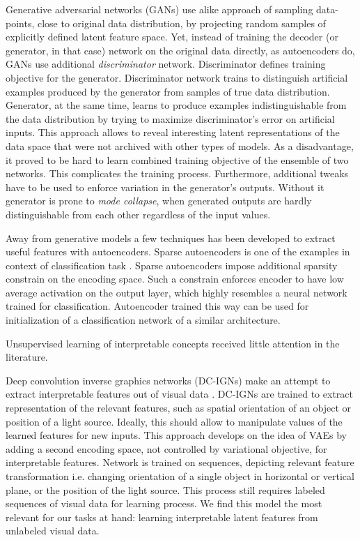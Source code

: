 Generative adversarial networks (GANs) \cite{Goodfellow2014} use alike approach of sampling data-points, close to original data distribution, by projecting random samples of explicitly defined latent feature space.
Yet, instead of training the decoder (or generator, in that case) network on the original data directly, as autoencoders do, GANs use additional \textit{discriminator} network.
Discriminator defines training objective for the generator.
Discriminator network trains to distinguish artificial examples produced by the generator from samples of true data distribution.
Generator, at the same time, learns to produce examples indistinguishable from the data distribution by trying to maximize discriminator's error on artificial inputs.
This approach allows to reveal interesting latent representations of the data space that were not archived with other types of models.
As a disadvantage, it proved to be hard to learn combined training objective of the ensemble of two networks.
This complicates the training process.
Furthermore, additional tweaks have to be used to enforce variation in the generator's outputs.
Without it generator is prone to \textit{mode collapse}, when generated outputs are hardly distinguishable from each other regardless of the input values.

Away from generative models a few techniques has been developed to extract useful features with autoencoders.
Sparse autoencoders is one of the examples in context of classification task \cite{Ng2011, Makhzani2013, Masci2011}.
Sparse autoencoders impose additional sparsity constrain on the encoding space.
Such a constrain enforces encoder to have low average activation on the output layer, which highly resembles a neural network trained for classification.
Autoencoder trained this way can be used for initialization of a classification network of a similar architecture.

Unsupervised learning of interpretable concepts received little attention in the literature.

Deep convolution inverse graphics networks (DC-IGNs) make an attempt to extract interpretable features out of visual data \cite{Kulkarni2015}.
DC-IGNs are trained to extract representation of the relevant features, such as spatial orientation of an object or position of a light source.
Ideally, this should allow to manipulate values of the learned features for new inputs.
This approach develops on the idea of VAEs by adding a second encoding space, not controlled by variational objective, for interpretable features.
Network is trained on sequences, depicting relevant feature transformation i.e. changing orientation of a single object in horizontal or vertical plane, or the position of the light source.
This process still requires labeled sequences of visual data for learning process.
We find this model the most relevant for our tasks at hand: learning interpretable latent features from unlabeled visual data.

